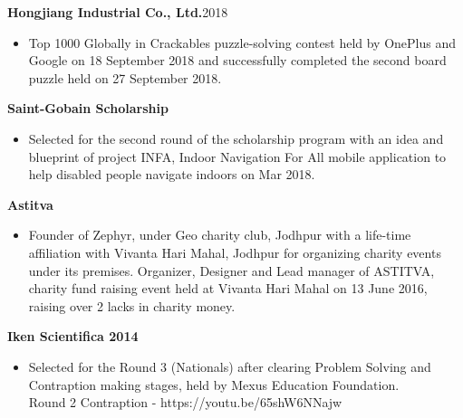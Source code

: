 \documentclass[10pt,a4paper,ragged2e]{altacv}
\begin{document}
\smallskip
\large{\textbf{Hongjiang Industrial Co., Ltd.}{2018}}
\begin{itemize}
\item[\faTrophy] Top 1000 Globally in Crackables puzzle-solving contest held by OnePlus and Google on 18 September 2018 and successfully completed the second board puzzle held on 27 September 2018.
\end{itemize}
\smallskip
\large{\textbf{Saint-Gobain Scholarship}}
\begin{itemize}
\item[\faTrophy] Selected for the second round of the scholarship program with an
idea and blueprint of project INFA, Indoor Navigation For All mobile application to help disabled people
navigate indoors on Mar 2018.
\end{itemize}
\smallskip
\large{\textbf{Astitva}}
\begin{itemize}
\item[\faTrophy] Founder of Zephyr, under Geo charity club, Jodhpur with a life-time affiliation with Vivanta Hari Mahal, Jodhpur for organizing charity events under its premises. Organizer, Designer and Lead manager of ASTITVA, charity fund raising event held at Vivanta Hari Mahal on 13 June 2016, raising over 2 lacks in charity money.
\end{itemize}
\smallskip
\large{\textbf{Iken Scientifica 2014}}
\begin{itemize}
\item[\faTrophy] Selected for the Round 3 (Nationals) after clearing Problem Solving and Contraption making stages, held by Mexus Education Foundation.\\
Round 2 Contraption - https://youtu.be/65shW6NNajw
\end{itemize}
\smallskip

\clearpage
\nocite{*}
\end{document}
